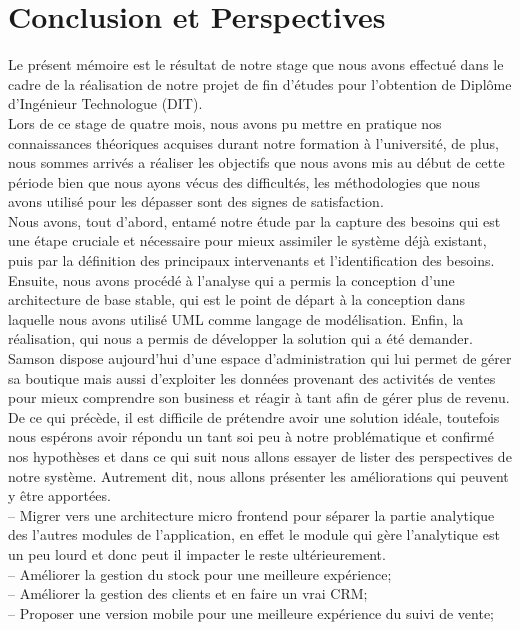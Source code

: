 \documentclass[a4paper, 12pt]{report}
\begin{document}
\chapter*{Conclusion et Perspectives} \mtcaddchapter
{}
Le présent mémoire est le résultat de notre stage que nous avons effectué dans le cadre de la
réalisation de notre projet de fin d’études pour l’obtention de Diplôme d'Ingénieur Technologue (DIT).\\
Lors de ce stage de quatre mois, nous avons pu mettre en pratique nos connaissances théoriques acquises durant notre formation à l’université, de plus, nous sommes arrivés a réaliser les objectifs que nous avons mis au début de cette période bien que nous ayons vécus des difficultés, les méthodologies que nous avons utilisé pour les dépasser sont des signes de satisfaction.\\
Nous avons, tout d’abord, entamé notre étude par la capture des besoins qui est une étape
cruciale et nécessaire pour mieux assimiler le système déjà existant, puis par la définition des
principaux intervenants et l’identification des besoins. Ensuite, nous avons procédé à l’analyse
qui a permis la conception d’une architecture de base stable, qui est le point de départ à la
conception dans laquelle nous avons utilisé UML comme langage de modélisation. Enfin, la réalisation, qui nous a permis de développer la solution qui a été demander.\\
Samson dispose aujourd'hui d'une espace d'administration qui lui permet de gérer sa boutique mais aussi d'exploiter les données provenant des activités de ventes pour mieux comprendre son business et réagir à tant afin de gérer plus de revenu. \\

De ce qui précède, il est difficile de prétendre avoir une solution idéale, toutefois nous
espérons avoir répondu un tant soi peu à notre problématique et confirmé nos hypothèses et
dans ce qui suit nous allons essayer de lister des perspectives de notre système. Autrement dit,
nous allons présenter les améliorations qui peuvent y être apportées.\\ 

-- Migrer vers une architecture micro frontend pour séparer la partie analytique des l'autres modules de l'application, en effet le module qui gère l'analytique est un peu lourd et donc peut il impacter le reste ultérieurement.\\

-- Améliorer la gestion du stock pour une meilleure expérience;\\

-- Améliorer la gestion des clients et en faire un vrai CRM;\\

-- Proposer une version mobile pour une meilleure expérience du suivi de vente; 



\end{document}
